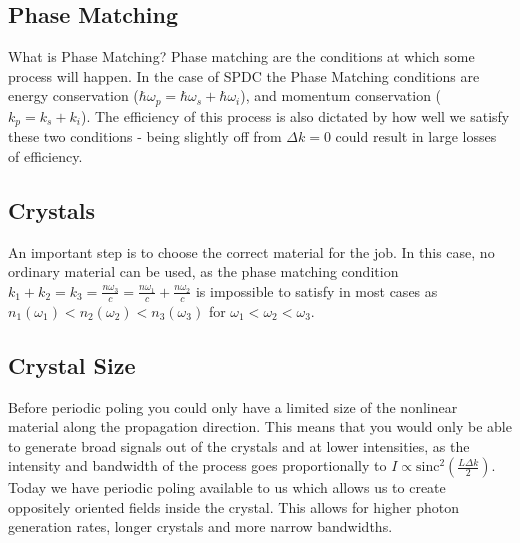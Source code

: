 \documentclass{article}
\begin{document}
\subsection{Phase Matching}
What is Phase Matching? Phase matching are the conditions at which some process will happen.
In the case of SPDC the Phase Matching conditions are energy conservation ($\hbar \omega_p = \hbar \omega_s + \hbar \omega_i$),
and momentum conservation ($k_p = k_s + k_i$). The efficiency of this process is also dictated by how well we satisfy these 
two conditions - being slightly off from $\Delta k = 0$ could result in large losses of efficiency.

\subsection{Crystals}
An important step is to choose the correct material for the job. In this case, no ordinary material can be used, 
as the phase matching condition $k_1 + k_2 = k_3 = \frac{n \omega_3}{c} = \frac{n \omega_1}{c} + \frac{n \omega_2}{c}$ is
impossible to satisfy in most cases as
$n_1 \left(	\omega_1 \right) < n_2 \left( \omega_2 \right) < n_3 \left(	\omega_3 \right)$ for $\omega_1 < \omega_2 < \omega_3$.

\subsection{Crystal Size}
Before periodic poling you could only have a limited size of the nonlinear material along the propagation direction.
This means that you would only be able to generate broad signals out of the crystals and at lower intensities, as the 
intensity and bandwidth of the process goes proportionally to $I \propto \text{sinc}^2\left(\frac{L \Delta k}{2}\right)$.
Today we have periodic poling available to us which allows us to create oppositely oriented fields inside the
crystal. This allows for higher photon generation rates, longer crystals and more narrow bandwidths.
\end{document}

